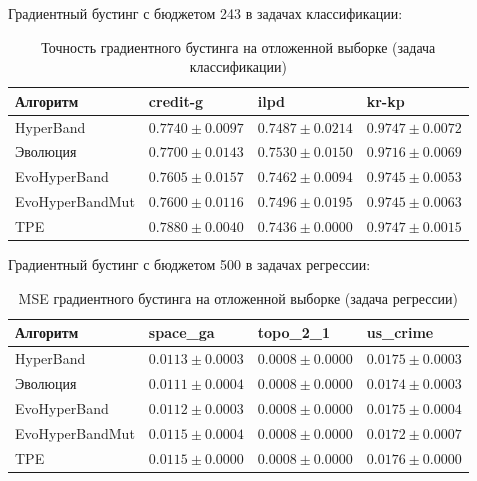 \documentclass[a4paper,12pt]{article}
\begin{document}
\newpage

Градиентный бустинг с бюджетом 243 в задачах классификации:
\begin{table}[h]
\centering
\begin{tabular}{|l|l|l|l|}
\hline
Алгоритм        & credit-g          & ilpd              & kr-kp             \\ \hline
HyperBand       & $0.7740 \pm 0.0097$ & $0.7487 \pm 0.0214$ & $\mathbf{0.9747 \pm 0.0072}$ \\ \hline
Эволюция        & $0.7700 \pm 0.0143$ & $\mathbf{0.7530 \pm 0.0150}$ & $0.9716 \pm 0.0069$ \\ \hline
EvoHyperBand    & $0.7605 \pm 0.0157$ & $0.7462 \pm 0.0094$ & $0.9745 \pm 0.0053$ \\ \hline
EvoHyperBandMut & $0.7600 \pm 0.0116$ & $0.7496 \pm 0.0195$ & $0.9745 \pm 0.0063$ \\ \hline
TPE             & $\mathbf{0.7880 \pm 0.0040}$ & $0.7436 \pm 0.0000$ & $\mathbf{0.9747 \pm 0.0015}$ \\ \hline
\end{tabular}
\caption{Точность градиентного бустинга на отложенной выборке (задача классификации)}
\label{tab:boosting_test}
\end{table}


Градиентный бустинг с бюджетом 500 в задачах регрессии:
\begin{table}[h]
\centering
\begin{tabular}{|l|l|l|l|}
\hline
Алгоритм        & space\_ga          & topo\_2\_1            & us\_crime          \\ \hline
HyperBand       & $0.0113 \pm 0.0003$ & $0.0008 \pm 0.0000$ & $0.0175 \pm 0.0003$ \\ \hline
Эволюция        & $\mathbf{0.0111 \pm 0.0004}$ & $0.0008 \pm 0.0000$ & $0.0174 \pm 0.0003$ \\ \hline
EvoHyperBand    & $0.0112 \pm 0.0003$ & $0.0008 \pm 0.0000$ & $0.0175 \pm 0.0004$ \\ \hline
EvoHyperBandMut & $0.0115 \pm 0.0004$ & $0.0008 \pm 0.0000$ & $\mathbf{0.0172 \pm 0.0007}$ \\ \hline
TPE             & $0.0115 \pm 0.0000$ & $0.0008 \pm 0.0000$ & $0.0176 \pm 0.0000$ \\ \hline
\end{tabular}
\caption{MSE градиентного бустинга на отложенной выборке (задача регрессии)}
\label{tab:boosting_regr_test}
\end{table}
\end{document}
